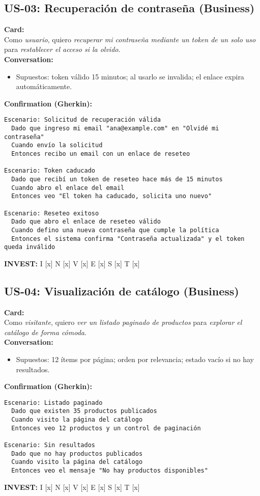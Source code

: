 \documentclass[11pt]{article}
\begin{document}
\subsection*{US-03: Recuperación de contraseña (Business)}
\begin{tcolorbox}
\textbf{Card:}\\
Como \emph{usuario}, quiero \emph{recuperar mi contraseña mediante un token de un solo uso} para \emph{restablecer el acceso si la olvido}.\\[3pt]
\textbf{Conversation:}
\begin{itemize}[leftmargin=1.2em]
  \item Supuestos: token válido 15 minutos; al usarlo se invalida; el enlace expira automáticamente.
\end{itemize}
\textbf{Confirmation (Gherkin):}
\begin{verbatim}
Escenario: Solicitud de recuperación válida
  Dado que ingreso mi email "ana@example.com" en "Olvidé mi contraseña"
  Cuando envío la solicitud
  Entonces recibo un email con un enlace de reseteo

Escenario: Token caducado
  Dado que recibí un token de reseteo hace más de 15 minutos
  Cuando abro el enlace del email
  Entonces veo "El token ha caducado, solicita uno nuevo"

Escenario: Reseteo exitoso
  Dado que abro el enlace de reseteo válido
  Cuando defino una nueva contraseña que cumple la política
  Entonces el sistema confirma "Contraseña actualizada" y el token queda inválido
\end{verbatim}
\textbf{INVEST:} I [x] N [x] V [x] E [x] S [x] T [x]
\end{tcolorbox}

\subsection*{US-04: Visualización de catálogo (Business)}
\begin{tcolorbox}
\textbf{Card:}\\
Como \emph{visitante}, quiero \emph{ver un listado paginado de productos} para \emph{explorar el catálogo de forma cómoda}.\\[3pt]
\textbf{Conversation:}
\begin{itemize}[leftmargin=1.2em]
  \item Supuestos: 12 ítems por página; orden por relevancia; estado vacío si no hay resultados.
\end{itemize}
\textbf{Confirmation (Gherkin):}
\begin{verbatim}
Escenario: Listado paginado
  Dado que existen 35 productos publicados
  Cuando visito la página del catálogo
  Entonces veo 12 productos y un control de paginación

Escenario: Sin resultados
  Dado que no hay productos publicados
  Cuando visito la página del catálogo
  Entonces veo el mensaje "No hay productos disponibles"
\end{verbatim}
\textbf{INVEST:} I [x] N [x] V [x] E [x] S [x] T [x]
\end{tcolorbox}
\end{document}
